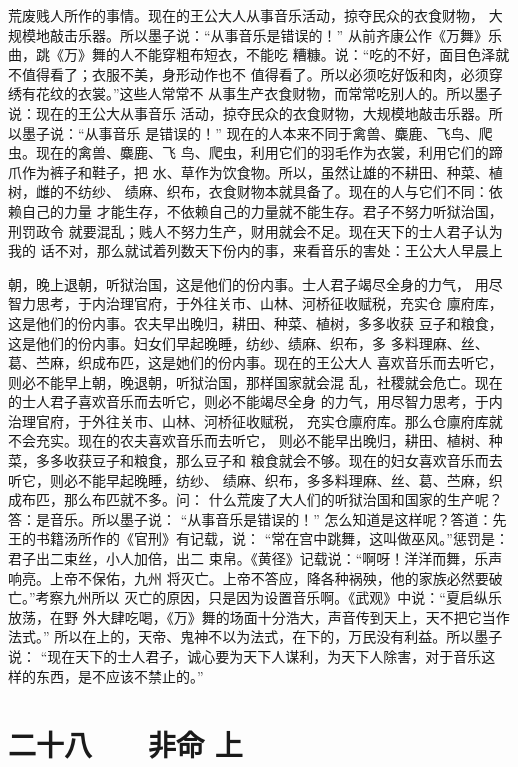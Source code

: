 \documentclass[12pt,UTF8]{ctexbook}
\begin{document}
荒废贱人所作的事情。现在的王公大人从事音乐活动，掠夺民众的衣食财物， 
大规模地敲击乐器。所以墨子说：“从事音乐是错误的！” 
从前齐康公作《万舞》乐曲，跳《万》舞的人不能穿粗布短衣，不能吃 
糟糠。说：“吃的不好，面目色泽就不值得看了；衣服不美，身形动作也不 
值得看了。所以必须吃好饭和肉，必须穿绣有花纹的衣裳。”这些人常常不 
从事生产衣食财物，而常常吃别人的。所以墨子说：现在的王公大从事音乐 
活动，掠夺民众的衣食财物，大规模地敲击乐器。所以墨子说：“从事音乐 
是错误的！” 
现在的人本来不同于禽兽、麋鹿、飞鸟、爬虫。现在的禽兽、麋鹿、飞 
鸟、爬虫，利用它们的羽毛作为衣裳，利用它们的蹄爪作为裤子和鞋子，把 
水、草作为饮食物。所以，虽然让雄的不耕田、种菜、植树，雌的不纺纱、 
绩麻、织布，衣食财物本就具备了。现在的人与它们不同：依赖自己的力量 
才能生存，不依赖自己的力量就不能生存。君子不努力听狱治国，刑罚政令 
就要混乱；贱人不努力生产，财用就会不足。现在天下的士人君子认为我的 
话不对，那么就试着列数天下份内的事，来看音乐的害处：王公大人早晨上 

朝，晚上退朝，听狱治国，这是他们的份内事。士人君子竭尽全身的力气， 
用尽智力思考，于内治理官府，于外往关市、山林、河桥征收赋税，充实仓 
廪府库，这是他们的份内事。农夫早出晚归，耕田、种菜、植树，多多收获 
豆子和粮食，这是他们的份内事。妇女们早起晚睡，纺纱、绩麻、织布，多 
多料理麻、丝、葛、苎麻，织成布匹，这是她们的份内事。现在的王公大人 
喜欢音乐而去听它，则必不能早上朝，晚退朝，听狱治国，那样国家就会混 
乱，社稷就会危亡。现在的士人君子喜欢音乐而去听它，则必不能竭尽全身 
的力气，用尽智力思考，于内治理官府，于外往关市、山林、河桥征收赋税， 
充实仓廪府库。那么仓廪府库就不会充实。现在的农夫喜欢音乐而去听它， 
则必不能早出晚归，耕田、植树、种菜，多多收获豆子和粮食，那么豆子和 
粮食就会不够。现在的妇女喜欢音乐而去听它，则必不能早起晚睡，纺纱、 
绩麻、织布，多多料理麻、丝、葛、苎麻，织成布匹，那么布匹就不多。问： 
什么荒废了大人们的听狱治国和国家的生产呢？答：是音乐。所以墨子说： 
“从事音乐是错误的！” 
怎么知道是这样呢？答道：先王的书籍汤所作的《官刑》有记载，说： 
“常在宫中跳舞，这叫做巫风。”惩罚是：君子出二束丝，小人加倍，出二 
束帛。《黄径》记载说：“啊呀！洋洋而舞，乐声响亮。上帝不保佑，九州 
将灭亡。上帝不答应，降各种祸殃，他的家族必然要破亡。”考察九州所以 
灭亡的原因，只是因为设置音乐啊。《武观》中说：“夏启纵乐放荡，在野 
外大肆吃喝，《万》舞的场面十分浩大，声音传到天上，天不把它当作法式。” 
所以在上的，天帝、鬼神不以为法式，在下的，万民没有利益。所以墨子说： 
“现在天下的士人君子，诚心要为天下人谋利，为天下人除害，对于音乐这 
样的东西，是不应该不禁止的。” 

\chapter{二十八　　非命 上}
\end{document}
